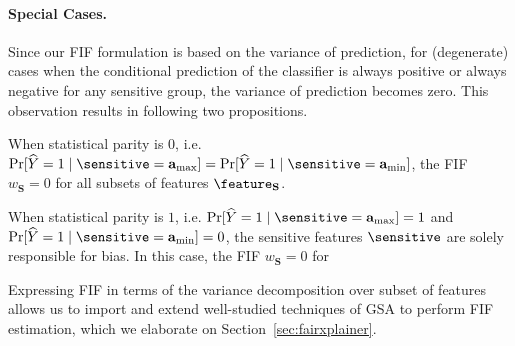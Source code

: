 \paragraph{Special Cases.} Since our FIF formulation is based on the variance of prediction, for (degenerate) cases when the conditional prediction of the classifier is always positive or always negative for any sensitive group, the variance of prediction becomes zero. This observation results in following two propositions.

\begin{proposition}
	When statistical parity is $ 0 $, i.e. $ \Pr[\widehat{Y} = 1 \mid \sensitive = \mathbf{a}_{\max} ] = \Pr[\widehat{Y} = 1 \mid \sensitive = \mathbf{a}_{\min} ] $, the FIF $w_{\mathbf{S}}  = 0 $ for all subsets of features $ \feature_{\mathbf{S}} $.
\end{proposition}
\begin{proposition}
	When statistical parity is $ 1 $, i.e. $ \Pr[\widehat{Y} = 1 \mid \sensitive = \mathbf{a}_{\max} ] = 1 $ and $ \Pr[\widehat{Y} = 1 \mid \sensitive = \mathbf{a}_{\min} ] = 0 $, the sensitive features $ \sensitive $ are solely responsible for bias. In this case, the FIF $ w_{\mathbf{S}} = 0 $ for  
\end{proposition}




Expressing FIF in terms of the variance decomposition over subset of features allows us to import and extend well-studied techniques of GSA to perform FIF estimation, which we elaborate on Section~\ref{sec:fairxplainer}.
